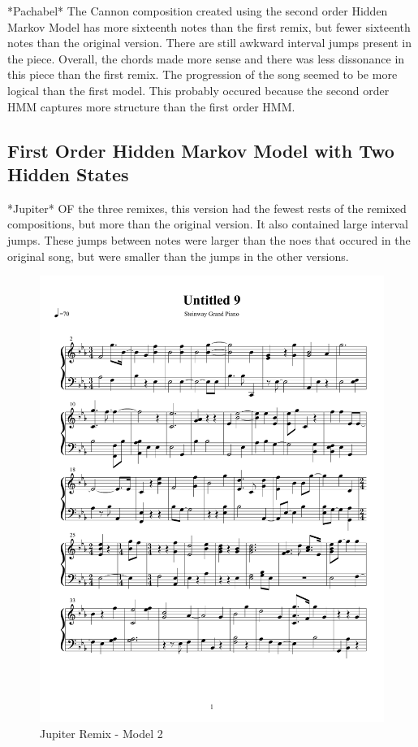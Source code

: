 \documentclass{article} %
\begin{document}
*Pachabel*
The Cannon composition created using the second order Hidden Markov Model has more sixteenth notes than the first remix, but fewer sixteenth notes than the original version. There are still awkward interval jumps present in the piece. Overall, the chords made more sense and there was less dissonance in this piece than the first remix. The progression of the song seemed to be more logical than the first model. This probably occured because the second order HMM captures more structure than the first order HMM.

\subsection{First Order Hidden Markov Model with Two Hidden States}

*Jupiter*
OF the three remixes, this version had the fewest rests of the remixed compositions, but more than the original version. It also contained large interval jumps. These jumps between notes were larger than the noes that occured in the original song, but were smaller than the jumps in the other versions. 


\begin{figure}[H]
\centering
\caption{Jupiter Remix - Model 2}
\includegraphics [scale = 0.6] {JupiterRemix2H-cropped.pdf}
\end{figure}
\end{document}
